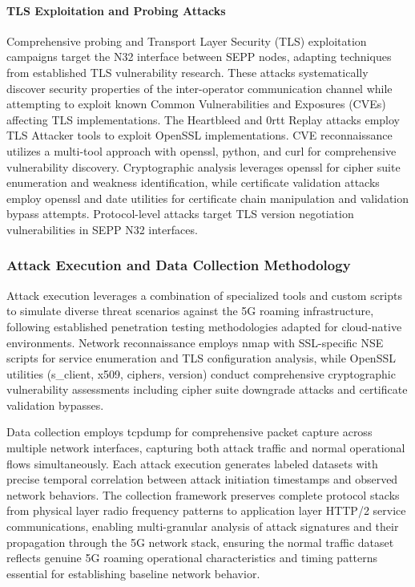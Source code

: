\documentclass[journal,article,submit,moreauthors,pdftex]{Definitions/tsp}
\begin{document}
\paragraph{TLS Exploitation and Probing Attacks}
Comprehensive probing and Transport Layer Security (TLS) exploitation campaigns target the N32 interface between SEPP nodes, adapting techniques from established TLS vulnerability research. These attacks systematically discover security properties of the inter-operator communication channel while attempting to exploit known Common Vulnerabilities and Exposures (CVEs) affecting TLS implementations. The Heartbleed and 0rtt Replay attacks employ TLS Attacker tools to exploit OpenSSL implementations. CVE reconnaissance utilizes a multi-tool approach with openssl, python, and curl for comprehensive vulnerability discovery. Cryptographic analysis leverages openssl for cipher suite enumeration and weakness identification, while certificate validation attacks employ openssl and date utilities for certificate chain manipulation and validation bypass attempts. Protocol-level attacks target TLS version negotiation vulnerabilities in SEPP N32 interfaces.

\subsubsection{Attack Execution and Data Collection Methodology}

Attack execution leverages a combination of specialized tools and custom scripts to simulate diverse threat scenarios against the 5G roaming infrastructure, following established penetration testing methodologies adapted for cloud-native environments. Network reconnaissance employs nmap with SSL-specific NSE scripts for service enumeration and TLS configuration analysis, while OpenSSL utilities (s\_client, x509, ciphers, version) conduct comprehensive cryptographic vulnerability assessments including cipher suite downgrade attacks and certificate validation bypasses. 

Data collection employs tcpdump for comprehensive packet capture across multiple network interfaces, capturing both attack traffic and normal operational flows simultaneously. Each attack execution generates labeled datasets with precise temporal correlation between attack initiation timestamps and observed network behaviors. The collection framework preserves complete protocol stacks from physical layer radio frequency patterns to application layer HTTP/2 service communications, enabling multi-granular analysis of attack signatures and their propagation through the 5G network stack, ensuring the normal traffic dataset reflects genuine 5G roaming operational characteristics and timing patterns essential for establishing baseline network behavior.
\end{document}

